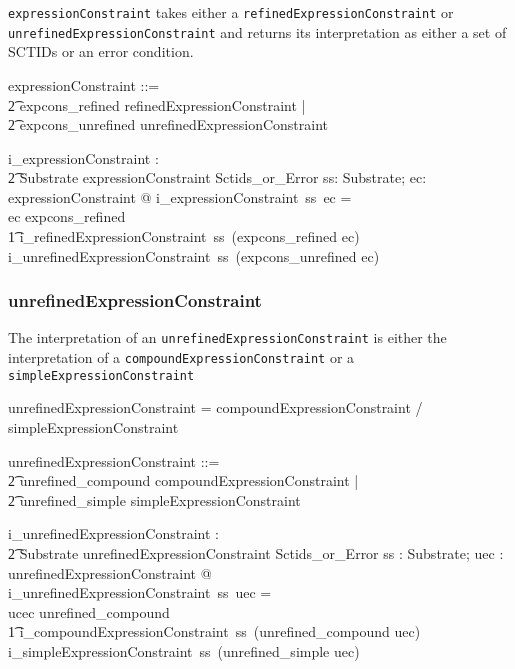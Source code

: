\documentclass{article}
\def\spec#1{{\tt #1}}
\def\bnf#1{{\scriptsize {{#1}} }}
\begin{document}
\spec{expressionConstraint} takes either a \spec{refinedExpressionConstraint} or \\ \spec{unrefinedExpressionConstraint} and returns its interpretation as either a set of SCTIDs or an error condition.
\begin{zed}
expressionConstraint ::= \\
\t2 expcons\_refined \ldata refinedExpressionConstraint \rdata | \\
\t2 expcons\_unrefined \ldata unrefinedExpressionConstraint \rdata \\
\end{zed}


\begin{gendef}
   i\_expressionConstraint : \\
\t2 Substrate \fun expressionConstraint \fun Sctids\_or\_Error
\where
   \forall ss: Substrate; ec: expressionConstraint @ i\_expressionConstraint~ss~ec = \\
   \IF ec \in \ran expcons\_refined  \\
\t1 \THEN i\_refinedExpressionConstraint~ss~(expcons\_refined \inv ec) \\
   \ELSE i\_unrefinedExpressionConstraint~ss~(expcons\_unrefined \inv ec) 
\end{gendef}

\subsubsection{unrefinedExpressionConstraint}
The interpretation of an \spec{unrefinedExpressionConstraint} is either the interpretation of a \spec{compoundExpressionConstraint} or a \spec{simpleExpressionConstraint}

\begin{framed}
\noindent
\bnf{unrefinedExpressionConstraint = compoundExpressionConstraint / simpleExpressionConstraint}
\end{framed}

\begin{zed}
unrefinedExpressionConstraint ::= \\
\t2 unrefined\_compound \ldata compoundExpressionConstraint \rdata | \\
\t2 unrefined\_simple \ldata simpleExpressionConstraint \rdata
\end{zed}
\begin{gendef}
   i\_unrefinedExpressionConstraint : \\
\t2 Substrate \fun unrefinedExpressionConstraint \fun Sctids\_or\_Error
\where
   \forall ss : Substrate; uec : unrefinedExpressionConstraint @  \\
   i\_unrefinedExpressionConstraint~ss~uec = \\
   \IF ucec \in \ran unrefined\_compound \\
\t1 \THEN i\_compoundExpressionConstraint~ss~(unrefined\_compound \inv uec) \\
\ELSE  i\_simpleExpressionConstraint~ss~(unrefined\_simple \inv uec) 
\end{gendef}
\end{document}
